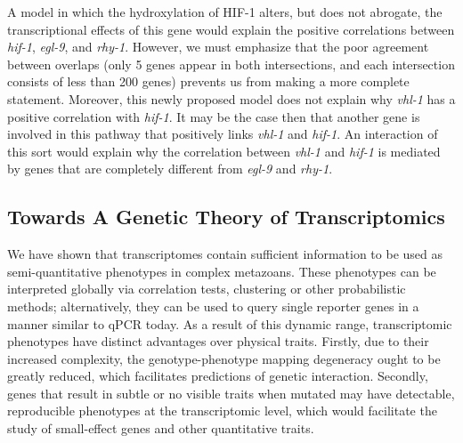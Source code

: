 \documentclass[9pt,twocolumn,twoside]{pnas-new}
\newcommand{\cel}{\emph{C.~elegans}}
\newcommand{\egl}{\emph{egl-9}}
\newcommand{\rhy}{\emph{rhy-1}}
\newcommand{\vhl}{\emph{vhl-1}}
\newcommand{\hif}{\emph{hif-1}}
\newcommand{\hifp}{HIF-1}
\begin{document}
A model in which the hydroxylation of \hifp{} alters, but does not abrogate, the
transcriptional effects of this gene would explain the positive correlations
between \hif{}, \egl{}, and \rhy{}. However, we must emphasize that the poor
agreement between overlaps (only 5 genes appear in both intersections, and each
intersection consists of less than 200 genes) prevents us from making a more
complete statement. Moreover, this newly proposed model does not explain why
\vhl{} has a positive correlation with \hif{}. It may be the case then that
another gene is involved in this pathway that positively links \vhl{} and
\hif{}. An interaction of this sort would explain why the correlation between
\vhl{} and \hif{} is mediated by genes that are completely different from \egl{}
and \rhy{}.



\subsection{Towards A Genetic Theory of Transcriptomics}
We have shown that transcriptomes contain sufficient information to be used as
semi-quantitative phenotypes in complex metazoans. These phenotypes can be
interpreted globally via correlation tests, clustering or other probabilistic
methods; alternatively, they can be used to query single reporter genes in a
manner similar to qPCR today. As a result of this dynamic range, transcriptomic
phenotypes have distinct advantages over physical traits.
Firstly, due to their increased complexity, the genotype-phenotype mapping
degeneracy ought to be greatly reduced, which facilitates predictions of genetic
interaction. Secondly, genes that result in subtle or no visible traits when
mutated may have detectable, reproducible phenotypes at the transcriptomic level,
which would facilitate the study of small-effect genes and other quantitative
traits.
\end{document}
